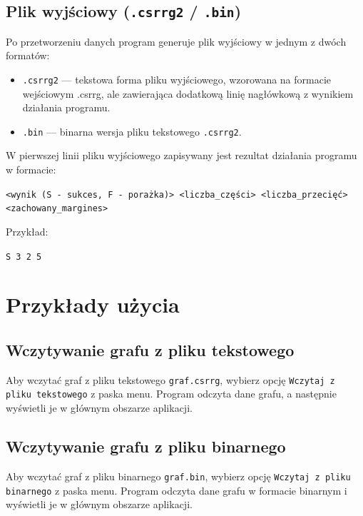 \documentclass{article}
\begin{document}
    \subsection{Plik wyjściowy (\texttt{.csrrg2} / \texttt{.bin})}

    Po przetworzeniu danych program generuje plik wyjściowy w jednym z dwóch formatów:
    \begin{itemize}
        \item \texttt{.csrrg2} — tekstowa forma pliku wyjściowego, wzorowana na formacie wejściowym .csrrg, ale zawierająca dodatkową linię nagłówkową z wynikiem działania programu.
        \item \texttt{.bin} — binarna wersja pliku tekstowego \texttt{.csrrg2}.
    \end{itemize}
    
    W pierwszej linii pliku wyjściowego zapisywany jest rezultat działania programu w formacie:
    \begin{center}
    \texttt{<wynik (S - sukces, F - porażka)> <liczba\_części> <liczba\_przecięć> <zachowany\_margines>}
    \end{center}
    Przykład:
    \begin{center}
    \texttt{S 3 2 5}
    \end{center}



\section{Przykłady użycia}

    \subsection{Wczytywanie grafu z pliku tekstowego}
    
    Aby wczytać graf z pliku tekstowego \texttt{graf.csrrg}, wybierz opcję \texttt{Wczytaj z pliku tekstowego} z paska menu. Program odczyta dane grafu, a następnie wyświetli je w głównym obszarze aplikacji.

    \subsection{Wczytywanie grafu z pliku binarnego}
    
    Aby wczytać graf z pliku binarnego \texttt{graf.bin}, wybierz opcję \texttt{Wczytaj z pliku binarnego} z paska menu. Program odczyta dane grafu w formacie binarnym i wyświetli je w głównym obszarze aplikacji.
    
\end{document}
